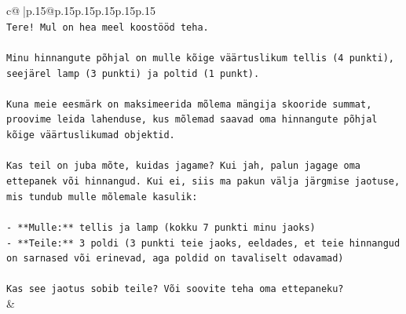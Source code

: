 \documentclass{article}
\begin{document}
{\begin{supertabular}{c@{$\;$}|p{.15\linewidth}@{}p{.15\linewidth}p{.15\linewidth}p{.15\linewidth}p{.15\linewidth}p{.15\linewidth}}
{{{\\ 
\texttt{Tere! Mul on hea meel koostööd teha.} \\
\\ 
\texttt{Minu hinnangute põhjal on mulle kõige väärtuslikum tellis (4 punkti), seejärel lamp (3 punkti) ja poltid (1 punkt).} \\
\\ 
\texttt{Kuna meie eesmärk on maksimeerida mõlema mängija skooride summat, proovime leida lahenduse, kus mõlemad saavad oma hinnangute põhjal kõige väärtuslikumad objektid.} \\
\\ 
\texttt{Kas teil on juba mõte, kuidas jagame? Kui jah, palun jagage oma ettepanek või hinnangud. Kui ei, siis ma pakun välja järgmise jaotuse, mis tundub mulle mõlemale kasulik:} \\
\\ 
\texttt{{-} **Mulle:** tellis ja lamp (kokku 7 punkti minu jaoks)} \\
\texttt{{-} **Teile:** 3 poldi (3 punkti teie jaoks, eeldades, et teie hinnangud on sarnased või erinevad, aga poldid on tavaliselt odavamad)} \\
\\ 
\texttt{Kas see jaotus sobib teile? Või soovite teha oma ettepaneku?} \\
            }
        }
    }
    & \\ \\


\end{supertabular}}
\end{document}
